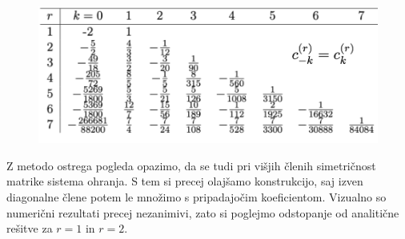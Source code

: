\documentclass{article}
\begin{document}
\begin{figure}[H]
	\centering
	\includegraphics[width=0.7\linewidth]{table.png}
\end{figure}
Z metodo ostrega pogleda opazimo, da se tudi pri višjih členih simetričnost matrike sistema ohranja. S tem si precej olajšamo konstrukcijo, saj izven diagonalne člene potem le množimo s pripadajočim koeficientom. Vizualno so numerični rezultati precej nezanimivi, zato si poglejmo odstopanje od analitične rešitve za $r=1$ in $r=2$.
\end{document}
